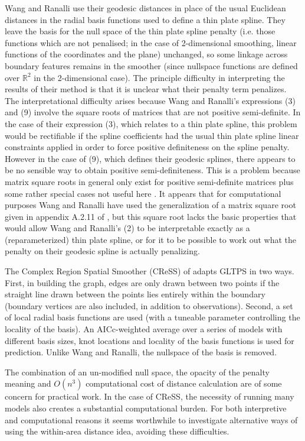 \documentclass[smallextended]{svjour3}       %
\begin{document}
Wang and Ranalli use their geodesic distances in place of the usual Euclidean distances in the radial basis functions used to define a thin plate spline. They leave the basis for the null space of the thin plate spline penalty (i.e. those functions which are not penalised; in the case of 2-dimensional smoothing, linear functions of the coordinates and the plane) unchanged, so some linkage across boundary features remains in the smoother (since nullspace functions are defined over $\mathbb{R}^2$ in the 2-dimensional case). The principle difficulty in interpreting the results of their method is that it is unclear what their penalty term penalizes. The interpretational difficulty arises because  Wang and Ranalli's expressions (3) and (9) involve the square roots of matrices that are not positive semi-definite. In the case of their expression (3), which relates to a thin plate spline, this problem would be rectifiable if the spline coefficients had the usual thin plate spline linear constraints applied in order to force positive definiteness on the spline penalty. However in the case of (9), which defines their geodesic splines, there appears to be no sensible way to obtain positive semi-definiteness. This is a problem because matrix square roots in general only exist for positive semi-definite matrices plus some rather special cases not useful here \citep[see e.g.]{Higham1987405}. It appears that for computational purposes Wang and Ranalli have used the generalization of a matrix square root given in appendix A.2.11 of \cite{ruppert2003semiparametric}, but this square root lacks the basic properties that would allow Wang and Ranalli's (2) to be interpretable exactly as a (reparameterized) thin plate spline, or for it to be possible to work out what the penalty on their geodesic spline is actually penalizing. 

The Complex Region Spatial Smoother (CReSS) of \cite{ScottHayward:2011tc} adapts GLTPS in two ways. First, in building the graph, edges are only drawn between two points if the straight line drawn between the points lies entirely within the boundary (boundary vertices are also included, in addition to observations). Second, a set of local radial basis functions are used (with a tuneable parameter controlling the locality of the basis). An AICc-weighted average over a series of models with different basis sizes, knot locations and locality of the basis functions is used for prediction. Unlike Wang and Ranalli, the nullspace of the basis is removed.

The combination of an un-modified null space, the opacity of the penalty meaning and $O(n^3)$ computational cost of distance calculation are of some concern for practical work. In the case of CReSS, the necessity of running many models also creates a substantial computational burden. For both interpretive and computational reasons it seems worthwhile to investigate alternative ways of using the within-area distance idea, avoiding these difficulties.
\end{document}
